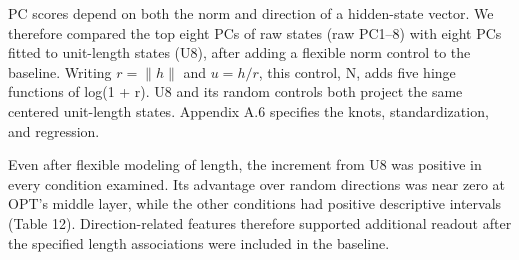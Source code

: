 PC scores depend on both the norm and direction of a hidden-state vector. We therefore compared the top eight PCs of raw states (raw PC1--8) with eight PCs fitted to unit-length states (U8), after adding a flexible norm control to the baseline. Writing \(r=\|h\|\) and \(u=h/r\), this control, N, adds five hinge functions of log(1 + r). U8 and its random controls both project the same centered unit-length states. Appendix A.6 specifies the knots, standardization, and regression.

Even after flexible modeling of length, the increment from U8 was positive in every condition examined. Its advantage over random directions was near zero at OPT's middle layer, while the other conditions had positive descriptive intervals (Table 12). Direction-related features therefore supported additional readout after the specified length associations were included in the baseline.

